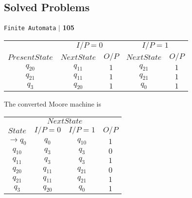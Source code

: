 \documentclass[8pt]{beamer}
\begin{document}
\begin{frame}
 \section*{Solved Problems}
\begin{flushright}
 \texttt{Finite Automata} \hspace*{0.1cm}\textbf{$|$} \hspace*{0.1cm} \textbf{105}\hspace*{0.1cm}
\end{flushright}
\vspace*{0.5cm}

\begin{center}
\begin{tabular}{ccccc}
 \hline

 \hline

 \hline

 \hline
 &  \multicolumn{2}{c}{$I/P = 0$ } &  \multicolumn{2}{c}{$I/P = 1$}  \\
  \cline{2-3}                         \cline{4-5}
 $Present State$ &   $Next State$  & $O/P$ &  $Next State$  & $O/P$\\
\hline
$q_20$             &  $q_11$  &  $1$  &  $q_21$  & $1$ \\
$q_21$             &  $q_11$  &  $1$  &  $q_21$  & $1$ \\
$q_3$             &  $q_20$  &  $1$  &  $q_0$  & $1$ \\

 \hline

 \hline

 \hline

 \hline
\end{tabular}
\end{center}

\vspace*{0.1cm}
The converted Moore machine is\\
\vspace*{0.1cm}

\begin{center}
\begin{tabular}{cccc}
 \hline

 \hline

 \hline

 \hline
 & \multicolumn{2}{c}{$Next State$}\\
 \cline{2-3}
 $State$ &  $I/P=0$ & $I/P=1$  &  $O/P$\\
\hline
$\rightarrow q_0$  &    $q_0$   &  $q_10$   &  $1$ \\
$q_10$              &    $q_3$   &  $q_3$   &  $0$ \\
$q_11$              &    $q_3$   &  $q_3$   &  $1$ \\
$q_20$              &    $q_11$   &  $q_21$   &  $0$ \\
$q_21$              &    $q_11$   &  $q_21$   &  $1$ \\
$q_3$              &    $q_20$   &  $q_0$   &  $1$ \\
 \hline


\end{tabular}
\end{center}
\end{frame}
\end{document}
